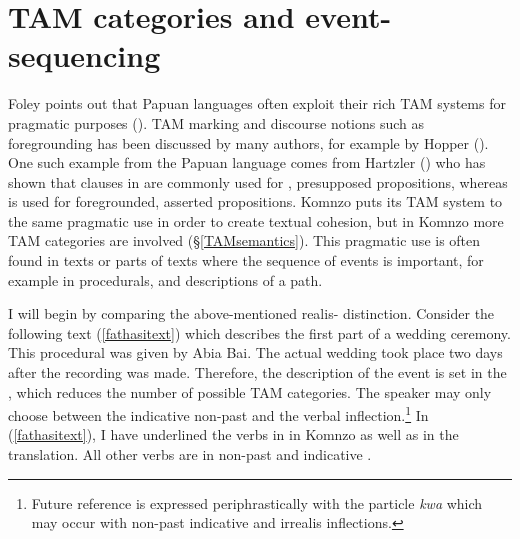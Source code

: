 \section{TAM categories and event-sequencing} \label{info-tam-event}

Foley points out that Papuan languages often exploit their rich TAM systems for pragmatic purposes (\citeyear[389]{Foley:2000uh}). TAM marking and discourse notions such as foregrounding has been discussed by many authors, for example by Hopper (\citeyear{Hopper:1979us}). One such example from the Papuan language  comes from Hartzler (\citeyear{Hartzler:1983wm}) who has shown that clauses in  are commonly used for , presupposed propositions, whereas  is used for foregrounded, asserted propositions. Komnzo puts its TAM system to the same pragmatic use in order to create textual cohesion, but in Komnzo more TAM categories are involved ({\S}\ref{TAMsemantics}). This pragmatic use is often found in texts or parts of texts where the sequence of events is important, for example in procedurals, and descriptions of a path.

I will begin by comparing the above-mentioned realis- distinction. Consider the following text (\ref{fathasitext}) which describes the first part of a wedding ceremony. This procedural was given by Abia Bai. The actual wedding took place two days after the recording was made. Therefore, the description of the event is set in the , which reduces the number of possible TAM categories. The speaker may only choose between the indicative non-past and the  verbal inflection.\footnote{Future reference is expressed periphrastically with the particle \emph{kwa} which may occur with non-past indicative and irrealis inflections.} In (\ref{fathasitext}), I have underlined the verbs in   in Komnzo as well as in the  translation. All other verbs are in non-past and indicative .

